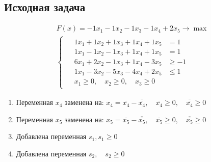 \subsection*{Исходная задача}
\begin{equation}
\begin{matrix}
    F(x) = -1x_{1} -1x_{2} -1x_{3} -1x_{4} + 2x_{5} \to \max \\
    \begin{cases}
    \begin{aligned}
        & 1x_{1} + 1x_{2} + 1x_{3} + 1x_{4} + 1x_{5} & = 1 \\
        & 1x_{1} -1x_{2} -1x_{3} + 1x_{4} + 1x_{5} & = 1 \\
        & 6x_{1} + 2x_{2} -1x_{3} + 1x_{4} -3x_{5} & \geq -1 \\
        & 1x_{1} -3x_{2} -5x_{3} -4x_{4} + 2x_{5} & \leq 1 \\
        & x_{1} \geq 0, \quad x_{2} \geq 0, \quad x_{3} \geq 0
    \end{aligned}
    \end{cases}
\end{matrix}
\end{equation}




\begin{enumerate}
\item Переменная $x_{4}$ заменена на: $x_{4} = \overline{x_{4}} - \overline{\overline{x_{4}}}, \quad \overline{x_{4}} \geq 0, \quad  \overline{\overline{x_{4}}} \geq 0$
\item Переменная $x_{5}$ заменена на: $x_{5} = \overline{x_{5}} - \overline{\overline{x_{5}}}, \quad \overline{x_{5}} \geq 0, \quad  \overline{\overline{x_{5}}} \geq 0$
\item Добавлена переменная $s_1,  s_1 \geq 0$
\item Добавлена переменная $s_2,  \quad s_2 \geq 0$
\end{enumerate}
